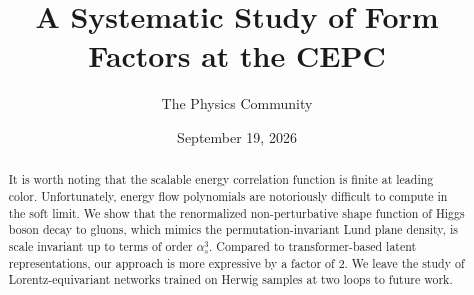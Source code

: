 \documentclass[11pt]{article}
\title{A Systematic Study of Form Factors at the CEPC}
\author{The Physics Community}
\date{September 19, 2026}
\numberwithin{equation}{section}
\theoremstyle{definition}
\theoremstyle{remark}
\begin{document}
\maketitle
\begin{abstract}
It is worth noting that the scalable energy correlation function is
finite at leading color. Unfortunately, energy flow polynomials are
notoriously difficult to compute in the soft limit. We show that the
renormalized non-perturbative shape function of Higgs boson decay to
gluons, which mimics the permutation-invariant Lund plane density, is
scale invariant up to terms of order $\alpha_s^3$. Compared to
transformer-based latent representations, our approach is more
expressive by a factor of 2. We leave the study of Lorentz-equivariant
networks trained on Herwig samples at two loops to future work.
\end{abstract}
\tableofcontents




\nocite{*}


\end{document}
